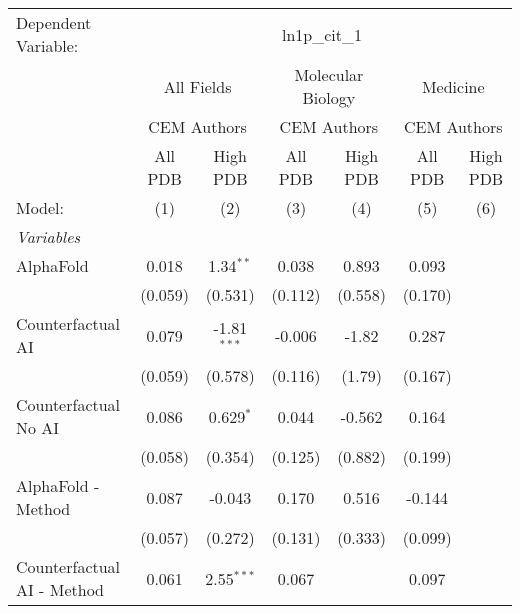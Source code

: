 \begingroup
\centering
\begin{tabular}{lcccccc}
   \tabularnewline \midrule \midrule
   Dependent Variable: & \multicolumn{6}{c}{ln1p\_cit\_1}\\
 & \multicolumn{2}{c}{All Fields} & \multicolumn{2}{c}{Molecular Biology} & \multicolumn{2}{c}{Medicine} \\
\cmidrule(lr){2-3} \cmidrule(lr){4-5} \cmidrule(lr){6-7}
 & \multicolumn{2}{c}{CEM Authors} & \multicolumn{2}{c}{CEM Authors} & \multicolumn{2}{c}{CEM Authors} \\
\cmidrule(lr){2-3} \cmidrule(lr){4-5} \cmidrule(lr){6-7}
 & \multicolumn{1}{c}{All PDB} & \multicolumn{1}{c}{High PDB} & \multicolumn{1}{c}{All PDB} & \multicolumn{1}{c}{High PDB} & \multicolumn{1}{c}{All PDB} & \multicolumn{1}{c}{High PDB} \\
\cmidrule(lr){2-2} \cmidrule(lr){3-3} \cmidrule(lr){4-4} \cmidrule(lr){5-5} \cmidrule(lr){6-6} \cmidrule(lr){7-7}
   Model:                                                     & (1)     & (2)           & (3)     & (4)     & (5)     & (6)\\  
   \midrule
   \emph{Variables}\\
   AlphaFold                                                  & 0.018   & 1.34$^{**}$   & 0.038   & 0.893   & 0.093   &   \\   
                                                              & (0.059) & (0.531)       & (0.112) & (0.558) & (0.170) &   \\   
   Counterfactual AI                                          & 0.079   & -1.81$^{***}$ & -0.006  & -1.82   & 0.287   &   \\   
                                                              & (0.059) & (0.578)       & (0.116) & (1.79)  & (0.167) &   \\   
   Counterfactual No AI                                       & 0.086   & 0.629$^{*}$   & 0.044   & -0.562  & 0.164   &   \\   
                                                              & (0.058) & (0.354)       & (0.125) & (0.882) & (0.199) &   \\   
   AlphaFold - Method                                         & 0.087   & -0.043        & 0.170   & 0.516   & -0.144  &   \\   
                                                              & (0.057) & (0.272)       & (0.131) & (0.333) & (0.099) &   \\   
   Counterfactual AI - Method                                 & 0.061   & 2.55$^{***}$  & 0.067   &         & 0.097   &   \\   

\end{tabular}
